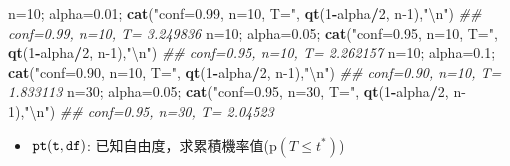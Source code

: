 \documentclass[hyperref,]{ctexart}
\newenvironment{Shaded}{\begin{snugshade}}{\end{snugshade}}
\newcommand{\CharTok}[1]{\textcolor[rgb]{0.31,0.60,0.02}{#1}}
\newcommand{\CommentTok}[1]{\textcolor[rgb]{0.56,0.35,0.01}{\textit{#1}}}
\newcommand{\DecValTok}[1]{\textcolor[rgb]{0.00,0.00,0.81}{#1}}
\newcommand{\FloatTok}[1]{\textcolor[rgb]{0.00,0.00,0.81}{#1}}
\newcommand{\KeywordTok}[1]{\textcolor[rgb]{0.13,0.29,0.53}{\textbf{#1}}}
\newcommand{\NormalTok}[1]{#1}
\newcommand{\OperatorTok}[1]{\textcolor[rgb]{0.81,0.36,0.00}{\textbf{#1}}}
\newcommand{\StringTok}[1]{\textcolor[rgb]{0.31,0.60,0.02}{#1}}
\providecommand{\tightlist}{%
  \setlength{\itemsep}{0pt}\setlength{\parskip}{0pt}}
\begin{document}
\begin{Shaded}
\begin{Highlighting}[]
\NormalTok{n=}\DecValTok{10}\NormalTok{; alpha=}\FloatTok{0.01}\NormalTok{; }\KeywordTok{cat}\NormalTok{(}\StringTok{"conf=0.99, n=10, T="}\NormalTok{, }\KeywordTok{qt}\NormalTok{(}\DecValTok{1}\OperatorTok{-}\NormalTok{alpha}\OperatorTok{/}\DecValTok{2}\NormalTok{, n}\DecValTok{-1}\NormalTok{),}\StringTok{"}\CharTok{\textbackslash{}n}\StringTok{"}\NormalTok{)}
\CommentTok{## conf=0.99, n=10, T= 3.249836}
\NormalTok{n=}\DecValTok{10}\NormalTok{; alpha=}\FloatTok{0.05}\NormalTok{; }\KeywordTok{cat}\NormalTok{(}\StringTok{"conf=0.95, n=10, T="}\NormalTok{, }\KeywordTok{qt}\NormalTok{(}\DecValTok{1}\OperatorTok{-}\NormalTok{alpha}\OperatorTok{/}\DecValTok{2}\NormalTok{, n}\DecValTok{-1}\NormalTok{),}\StringTok{"}\CharTok{\textbackslash{}n}\StringTok{"}\NormalTok{)}
\CommentTok{## conf=0.95, n=10, T= 2.262157}
\NormalTok{n=}\DecValTok{10}\NormalTok{; alpha=}\FloatTok{0.1}\NormalTok{; }\KeywordTok{cat}\NormalTok{(}\StringTok{"conf=0.90,  n=10, T="}\NormalTok{, }\KeywordTok{qt}\NormalTok{(}\DecValTok{1}\OperatorTok{-}\NormalTok{alpha}\OperatorTok{/}\DecValTok{2}\NormalTok{, n}\DecValTok{-1}\NormalTok{),}\StringTok{"}\CharTok{\textbackslash{}n}\StringTok{"}\NormalTok{)}
\CommentTok{## conf=0.90,  n=10, T= 1.833113}
\NormalTok{n=}\DecValTok{30}\NormalTok{; alpha=}\FloatTok{0.05}\NormalTok{; }\KeywordTok{cat}\NormalTok{(}\StringTok{"conf=0.95, n=30, T="}\NormalTok{, }\KeywordTok{qt}\NormalTok{(}\DecValTok{1}\OperatorTok{-}\NormalTok{alpha}\OperatorTok{/}\DecValTok{2}\NormalTok{, n}\DecValTok{-1}\NormalTok{),}\StringTok{"}\CharTok{\textbackslash{}n}\StringTok{"}\NormalTok{)}
\CommentTok{## conf=0.95, n=30, T= 2.04523}
\end{Highlighting}
\end{Shaded}

\begin{itemize}
\tightlist
\item
  \(\tt{pt(t, df)}\):
  已知自由度，求累積機率值(\(\text{p}(T\leq t^{*})\))
\end{itemize}
\end{document}
